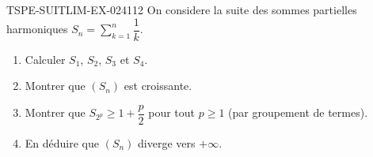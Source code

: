 \begin{exercice}{TSPE-SUITLIM-EX-024}{1}{12}
On considere la suite des sommes partielles harmoniques $S_n = \displaystyle\sum_{k=1}^{n} \dfrac{1}{k}$.
\begin{enumerate}
  \item Calculer $S_1$, $S_2$, $S_3$ et $S_4$.
  \item Montrer que $(S_n)$ est croissante.
  \item Montrer que $S_{2^p} \geq 1 + \dfrac{p}{2}$ pour tout $p \geq 1$ (par groupement de termes).
  \item En déduire que $(S_n)$ diverge vers $+\infty$.
\end{enumerate}
\end{exercice}
